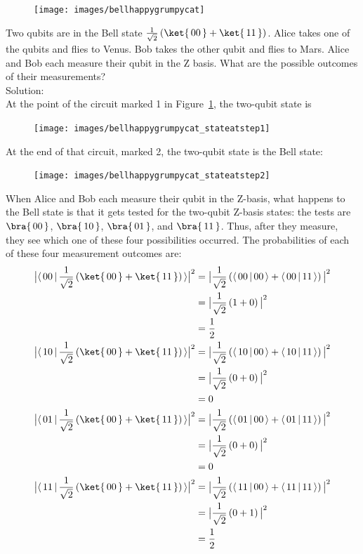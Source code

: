 \documentclass{article}
\newcommand{\soln}{{\\[1em] \hspace{-1em}\color{greentitle}\sffamily\large Solution: \\[0.5em]}}
\theoremstyle{definition}
\newcommand{\abs}[1]{{\big\vert} #1 {\big\vert}}
\newcommand{\kz}[1]{\ket{\,#1\,}}
\newcommand{\bz}[1]{\bra{\,#1\,}}
\begin{document}
\begin{figure}[H]
	\label{fig:bellhappygrumpycat}
	\texttt{[image: images/bellhappygrumpycat]}
\end{figure}
\newpage
\begin{example}
	Two qubits are in the Bell state $\frac{1}{\sqrt{2}} \left(\kz{00} + \kz{11}\right)$.  Alice takes one of the qubits and flies to Venus.  Bob takes the other qubit and flies to Mars.  Alice and Bob each measure their qubit in the Z basis.  What are the possible outcomes of their measurements?
	\soln \textnormal{At the point of the circuit marked 1 in Figure~\ref{fig:bellhappygrumpycat}, the two-qubit state is}
	\begin{figure}[H]
		\texttt{[image: images/bellhappygrumpycat\_stateatstep1]}
	\end{figure}
	\textnormal{At the end of that circuit, marked 2, the two-qubit state is the Bell state:}
	\begin{figure}[H]
		\texttt{[image: images/bellhappygrumpycat\_stateatstep2]}
	\end{figure}
	\textnormal{When Alice and Bob each measure their qubit in the Z-basis, what happens to the Bell state is that it gets tested for the two-qubit Z-basis states: the tests are $\bz{00}$, $\bz{10}$, $\bz{01}$, and $\bz{11}$.  Thus, after they measure, they see which one of these four possibilities occurred.  The probabilities of each of these four measurement outcomes are:}
	\begin{align}
		\abs{\langle \,00\,|\,\frac{1}{\sqrt{2}} \left(\kz{00} + \kz{11}\right)\,\rangle}^2 &= \abs{\frac{1}{\sqrt{2}}\left( \langle \,00\,|\,00\,\rangle + \langle \,00\,|\,11\,\rangle \right)}^2\\
		&= \abs{\frac{1}{\sqrt{2}}\left( 1 + 0 \right)}^2\\
		&= \frac{1}{2}\\
		\abs{\langle \,10\,|\,\frac{1}{\sqrt{2}} \left(\kz{00} + \kz{11}\right)\,\rangle}^2 &= \abs{\frac{1}{\sqrt{2}}\left( \langle \,10\,|\,00\,\rangle + \langle \,10\,|\,11\,\rangle \right)}^2\\
		&= \abs{\frac{1}{\sqrt{2}}\left( 0 + 0 \right)}^2\\
		&= 0\\
		\abs{\langle \,01\,|\,\frac{1}{\sqrt{2}} \left(\kz{00} + \kz{11}\right)\,\rangle}^2 &= \abs{\frac{1}{\sqrt{2}}\left( \langle \,01\,|\,00\,\rangle + \langle \,01\,|\,11\,\rangle \right)}^2\\
		&= \abs{\frac{1}{\sqrt{2}}\left( 0 + 0 \right)}^2\\
		&= 0\\
		\abs{\langle \,11\,|\,\frac{1}{\sqrt{2}} \left(\kz{00} + \kz{11}\right)\,\rangle}^2 &= \abs{\frac{1}{\sqrt{2}}\left( \langle \,11\,|\,00\,\rangle + \langle \,11\,|\,11\,\rangle \right)}^2\\
		&= \abs{\frac{1}{\sqrt{2}}\left( 0 + 1 \right)}^2\\
		&= \frac{1}{2}
	\end{align}
\end{example}
\end{document}
